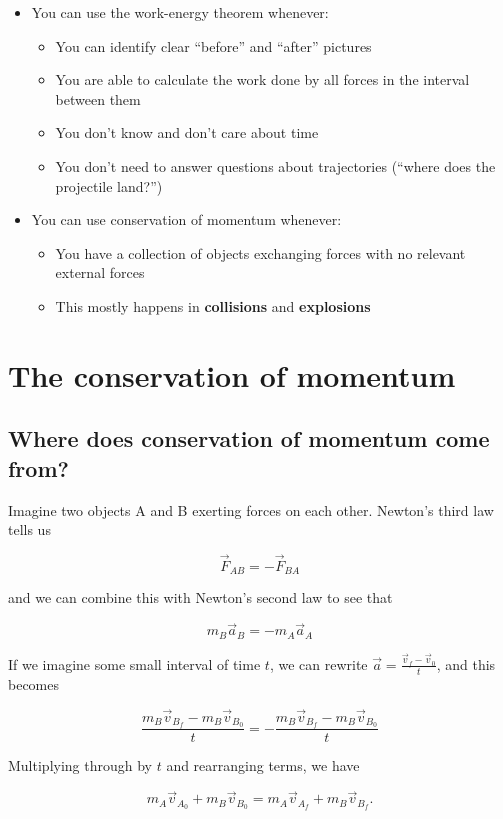 \documentclass[10pt]{article}
\begin{document}
\begin{itemize}
\item You can use the work-energy theorem whenever:
\begin{itemize}
\item You can identify clear ``before'' and ``after'' pictures
\item You are able to calculate the work done by all forces in the interval between them
\item You don't know and don't care about time
\item You don't need to answer questions about trajectories (``where does the projectile land?'')
\end{itemize}
\item You can use conservation of momentum whenever:
\begin{itemize}
\item You have a collection of objects exchanging forces with no relevant external forces
\item This mostly happens in {\bf collisions} and {\bf explosions}
\end{itemize}
\end{itemize}


\section{The conservation of momentum}

\subsection{Where does conservation of momentum come from?}

Imagine two objects A and B exerting forces on each other. Newton's third law tells us

$$\vec F_{AB} = -\vec F_{BA}$$

and we can combine this with Newton's second law to see that 

$$m_B\vec a_B = -m_A\vec a_A$$

If we imagine some small interval of time $t$, we can rewrite $\vec a = \frac{\vec v_f - \vec v_0}{t}$, and this becomes

$$\frac{m_B\vec v_{B_f} - m_B\vec v_{B_0}}{t} = - \frac{m_B\vec v_{B_f} - m_B\vec v_{B_0}}{t}$$

Multiplying through by $t$ and rearranging terms, we have

\begin{equation}
m_A\vec v_{A_0} + m_B\vec v_{B_0} = m_A\vec v_{A_f} + m_B\vec v_{B_f}.
\end{equation}
\end{document}

